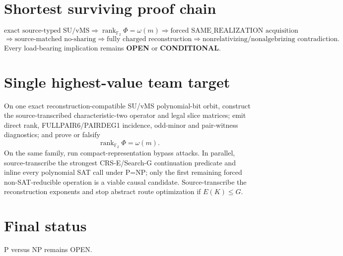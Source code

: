 \documentclass[11pt]{article}
\begin{document}
\section*{Shortest surviving proof chain}
\[
\text{exact source-typed SU/vMS}
\Longrightarrow
\operatorname{rank}_{\mathbb F_2}\Phi=\omega(m)
\Longrightarrow
\text{forced SAME\_REALIZATION acquisition}
\]
\[
\Longrightarrow
\text{source-matched no-sharing}
\Longrightarrow
\text{fully charged reconstruction}
\Longrightarrow
\text{nonrelativizing/nonalgebrizing contradiction}.
\]
Every load-bearing implication remains \textbf{OPEN} or \textbf{CONDITIONAL}.

\section*{Single highest-value team target}
On one exact reconstruction-compatible SU/vMS polynomial-bit orbit, construct the source-transcribed characteristic-two operator and legal slice matrices; emit direct rank, FULLPAIR6/PAIRDEG1 incidence, odd-minor and pair-witness diagnostics; and prove or falsify
\[
\boxed{\operatorname{rank}_{\mathbb F_2}\Phi=\omega(m)}.
\]
On the same family, run compact-representation bypass attacks. In parallel, source-transcribe the strongest CRS-E/Search-G continuation predicate and inline every polynomial SAT call under P=NP; only the first remaining forced non-SAT-reducible operation is a viable causal candidate. Source-transcribe the reconstruction exponents and stop abstract route optimization if \(E(K)\le G\).

\section*{Final status}
P versus NP remains OPEN.
\end{document}
